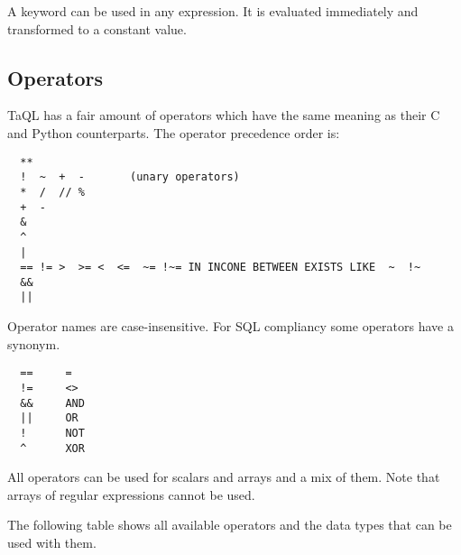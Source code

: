 A keyword can be used in any expression. It is evaluated immediately
and transformed to a constant value.

\subsection{\label{TAQL:OPERATORS}Operators}
TaQL has a fair amount of operators which have the same meaning as
their C and Python counterparts.
The operator precedence order is:
\begin{verbatim}
  **
  !  ~  +  -       (unary operators)
  *  /  // %
  +  -
  &
  ^
  |
  == != >  >= <  <=  ~= !~= IN INCONE BETWEEN EXISTS LIKE  ~  !~
  &&
  ||
\end{verbatim}
Operator names are case-insensitive.
For SQL compliancy some operators have a synonym.
\begin{verbatim}
  ==     =
  !=     <>
  &&     AND
  ||     OR
  !      NOT
  ^      XOR
\end{verbatim}
All operators can be used for scalars and arrays and a mix of them.
Note that arrays of regular expressions cannot be used.

The following table shows all available operators and the data types
that can be used with them.

